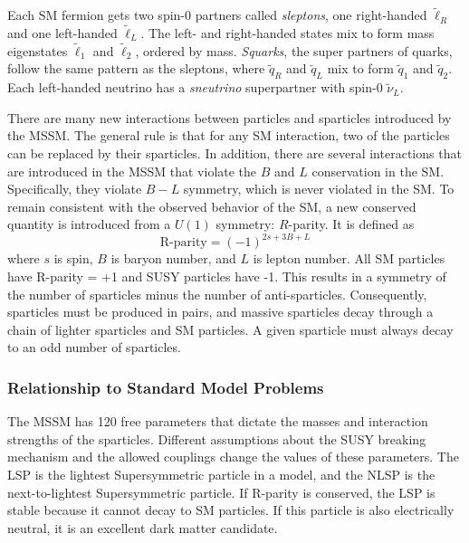 Each \ac{SM} fermion gets two spin-0 partners called \emph{sleptons}, one right-handed $\tilde{\ell}_{R}$ and one left-handed $\tilde{\ell}_{L}$. The left- and right-handed states mix to form mass eigenstates $\tilde{\ell}_{1}$ and $\tilde{\ell}_{2}$, ordered by mass. \emph{Squarks}, the super partners of quarks, follow the same pattern as the sleptons, where $\tilde{q}_{R}$ and $\tilde{q}_{L}$ mix to form $\tilde{q}_{1}$ and $\tilde{q}_{2}$. Each left-handed neutrino has a \emph{sneutrino} superpartner with spin-0 $\tilde{\nu}_{L}$.

There are many new interactions between particles and sparticles introduced by the \ac{MSSM}. The general rule is that for any \ac{SM} interaction, two of the particles can be replaced by their sparticles. In addition, there are several interactions that are introduced in the \ac{MSSM} that violate the $B$ and $L$ conservation in the \ac{SM}. Specifically, they violate $B-L$ symmetry, which is never violated in the \ac{SM}. To remain consistent with the observed behavior of the \ac{SM}, a new conserved quantity is introduced from a $U(1)$ symmetry: $R$-parity. It is defined as
\begin{equation}
\text{R-parity} = (-1)^{2s+ 3B+L}
\end{equation}
where $s$ is spin, $B$ is baryon number, and $L$ is lepton number. All \ac{SM} particles have R-parity = +1 and \ac{SUSY} particles have -1. This results in a symmetry of the number of sparticles minus the number of anti-sparticles. Consequently, sparticles must be produced in pairs, and massive sparticles decay through a chain of lighter sparticles and \ac{SM} particles. A given sparticle must always decay to an odd number of sparticles.


\subsubsection{Relationship to Standard Model Problems}

The \ac{MSSM} has 120 free parameters that dictate the masses and interaction strengths of the sparticles. Different assumptions about the \ac{SUSY} breaking mechanism and the allowed couplings change the values of these parameters. The LSP is the lightest Supersymmetric particle in a model, and the NLSP is the next-to-lightest Supersymmetric particle. If R-parity is conserved, the \ac{LSP} is stable because it cannot decay to \ac{SM} particles. If this particle is also electrically neutral, it is an excellent dark matter candidate.

